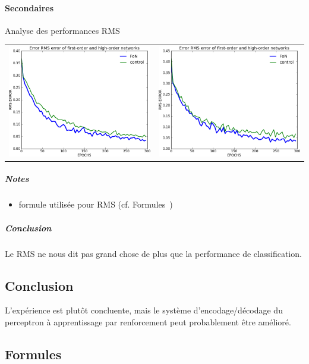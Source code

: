     \paragraph{Secondaires}
       Analyse des performances RMS
      \begin{center}
	\begin{tabular}{lr}
	  \hspace*{-1cm}
	  \includegraphics[width=250px]{data/expD4/rms.png}
	  &
	  \includegraphics[width=250px]{data/expD4/rms_100.png} 
	\end{tabular}
      \end{center} 
      \subparagraph{Notes}
	\begin{itemize}
	  \item formule utilisée pour RMS (cf. Formules~)
	\end{itemize}
      \subparagraph{Conclusion}
	Le RMS ne nous dit pas grand chose de plus que la performance de classification.

  \subsection{Conclusion}
  L'expérience est plutôt concluente, mais le système d'encodage/décodage du perceptron à apprentissage par renforcement 
  peut probablement être amélioré.
  

  \newpage 
  \subsection{Formules}
    
    
    
    


